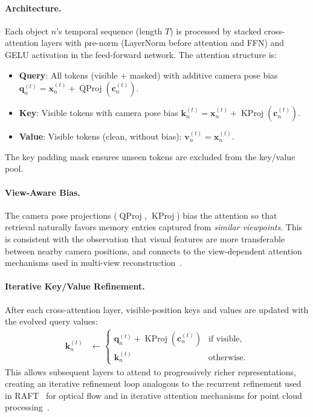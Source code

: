 \documentclass[runningheads]{llncs}
\newcommand{\op}[1]{\operatorname{#1}}
\newcommand{\mat}[1]{\bm{#1}}
\begin{document}
\paragraph{Architecture.}  Each object $n$'s temporal sequence (length $T$) is processed by stacked cross-attention layers with pre-norm (LayerNorm before attention and FFN) and GELU activation in the feed-forward network.  The attention structure is:
\begin{itemize}
    \item \textbf{Query}: All tokens (visible + masked) with additive camera pose bias $\mat{q}_n^{(t)} = \mat{x}_n^{(t)} + \op{QProj}(\mat{c}_n^{(t)})$.
    \item \textbf{Key}: Visible tokens with camera pose bias $\mat{k}_n^{(t)} = \mat{x}_n^{(t)} + \op{KProj}(\mat{c}_n^{(t)})$.
    \item \textbf{Value}: Visible tokens (clean, without bias): $\mat{v}_n^{(t)} = \mat{x}_n^{(t)}$.
\end{itemize}
The key padding mask ensures unseen tokens are excluded from the key/value pool.

\paragraph{View-Aware Bias.}  The camera pose projections ($\op{QProj}$, $\op{KProj}$) bias the attention so that retrieval naturally favors memory entries captured from \emph{similar viewpoints}.  This is consistent with the observation that visual features are more transferable between nearby camera positions, and connects to the view-dependent attention mechanisms used in multi-view reconstruction~\cite{wang2021ibrnet,yu2021pixelnerf}.

\paragraph{Iterative Key/Value Refinement.}  After each cross-attention layer, visible-position keys and values are updated with the evolved query values:
\begin{align}
    \mat{k}_n^{(t)} &\leftarrow \begin{cases} \mat{q}_n^{(t)} + \op{KProj}(\mat{c}_n^{(t)}) & \text{if visible}, \\ \mat{k}_n^{(t)} & \text{otherwise}. \end{cases} \label{eq:kv_update}
\end{align}
This allows subsequent layers to attend to progressively richer representations, creating an iterative refinement loop analogous to the recurrent refinement used in RAFT~\cite{teed2020raft} for optical flow and in iterative attention mechanisms for point cloud processing~\cite{zhao2021point}.
\end{document}
